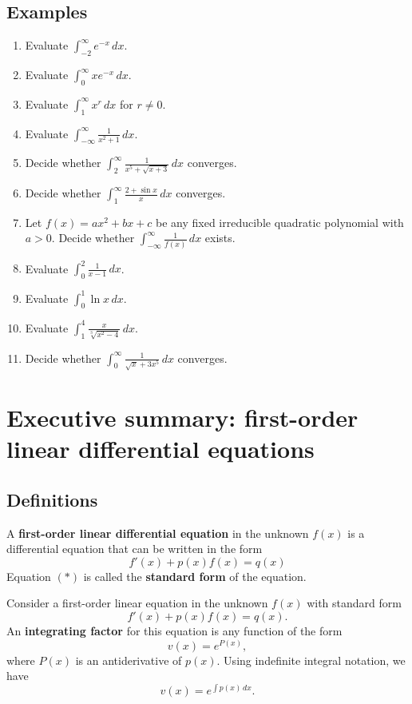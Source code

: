 \subsection*{Examples}
\begin{enumerate}
  \item Evaluate $\displaystyle\int_{-2}^{\infty}e^{-x}\, dx$.
  \item Evaluate $\displaystyle\int_{0}^\infty xe^{-x}\, dx$.
  \item Evaluate $\displaystyle\int_{1}^\infty x^{r}\, dx$ for $r\ne 0$.
  \item Evaluate $\displaystyle\int_{-\infty}^{\infty}\frac{1}{x^2+1}\, dx$.
  \item Decide whether $\displaystyle\int_2^\infty \frac{1}{x^5+\sqrt{x+3}}\, dx$ converges.
  \item Decide whether $\displaystyle\int_1^\infty \frac{2+\sin x}{x}\, dx$ converges.
  \item Let $f(x)=ax^2+bx+c$ be any fixed irreducible quadratic polynomial with $a>0$. Decide whether $\displaystyle\int_{-\infty}^\infty \frac{1}{f(x)}\, dx$ exists.
  \item Evaluate $\displaystyle\int_{0}^2\frac{1}{x-1}\, dx$.
  \item Evaluate $\displaystyle\int_0^{1}\ln x\, dx$.
  \item Evaluate $\displaystyle\int_1^{4}\frac{x}{\sqrt[3]{x^2-4}}\, dx$.
  \item Decide whether $\displaystyle\int_0^\infty\frac{1}{\sqrt{x}+3x^5}\, dx$ converges.
\end{enumerate}




\newpage

\section{Executive summary: first-order linear differential equations}

\thispagestyle{fancy}
\subsection*{Definitions}
\begin{namedtheorem}A {\bf first-order linear differential equation} in the unknown $f(x)$ is a differential equation that can be written in the form
  \[
  f'(x)+p(x)f(x)=q(x) \tag{$*$}
  \]
Equation $(*)$ is called the {\bf standard form} of the equation.
\end{namedtheorem}
\begin{namedtheorem} Consider a first-order linear equation in the unknown $f(x)$ with standard form
  \[
  f'(x)+p(x)f(x)=q(x).
  \]
  An {\bf integrating factor} for this equation is any function of the form
  \[
  v(x)=e^{P(x)},
  \]
  where $P(x)$ is an antiderivative of $p(x)$. Using indefinite integral notation, we have
  \[
  v(x)=e^{\int p(x)\, dx}.
  \]
\end{namedtheorem}

